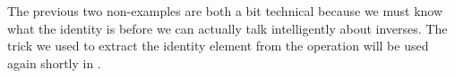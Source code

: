 \documentclass[../notes.tex]{subfiles}
\begin{document}
The previous two non-examples are both a bit technical because we must know what the identity is before we can actually talk intelligently about inverses. The trick we used to extract the identity element from the operation will be used again shortly in .




\end{document}
